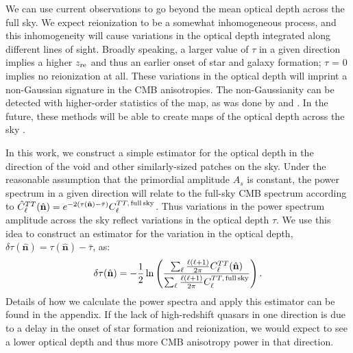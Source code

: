 \documentclass[]{pasa}
\begin{document}
We can use current observations to go beyond the mean optical depth across the full sky. 
We expect reionization to be a somewhat inhomogeneous process, and this inhomogeneity will cause variations in the optical depth integrated along different lines of sight. 
Broadly speaking, a larger value of $\tau$ in a given direction implies a higher $z_{\rm re}$ and thus an earlier onset of star and galaxy formation; $\tau$ = 0 implies no reionization at all.  
These variations in the optical depth will imprint a non-Gaussian signature in the CMB anisotropies. 
The non-Gaussianity can be detected with higher-order statistics of the map, as was done by \cite{Gluscevic2013} and \cite{Namikawa2017}. 
In the future, these methods will be able to create maps of the optical depth across the sky \citep{dvorkin2009}. 

In this work, we construct a simple estimator for the optical depth in the direction of the void and other similarly-sized patches on the sky. 
Under the reasonable assumption that the primordial amplitude $A_s$ is constant, the power spectrum in a given direction will relate to the full-sky CMB spectrum according to $\hat{C}^{TT}_{\ell}(\hat{\mathbf{n}}) = e^{-2(\tau(\hat{\mathbf{n}}) - \bar{\tau})}C_{\ell}^{TT,\,\rm full\,sky}$. 
Thus variations in the power spectrum amplitude across the sky reflect variations in the optical depth $\tau$. 
We use this idea to construct an estimator for the variation in the optical depth, $\delta\tau(\hat{\mathbf{n}}) = \tau(\hat{\mathbf{n}}) - \bar{\tau}$, as: 
\begin{equation}
\label{eq:tau_estimator}
\delta\tau(\hat{\mathbf{n}}) = -\frac{1}{2}\ln \left( \frac{\sum_{\ell}\frac{\ell(\ell+1)}{2\pi}C^{TT}_{\ell}(\hat{\mathbf{n}})}{\sum_{\ell}\frac{\ell(\ell+1)}{2\pi}C^{TT, \,\rm full\,sky}_{\ell}}\right). 
\end{equation}
Details of how we calculate the power spectra and apply this estimator can be found in the appendix. 
If the lack of high-redshift quasars in one direction is due to a delay in the onset of star formation and reionization, we would expect to see a lower optical depth and thus more CMB anisotropy power in that direction. 
\end{document}
